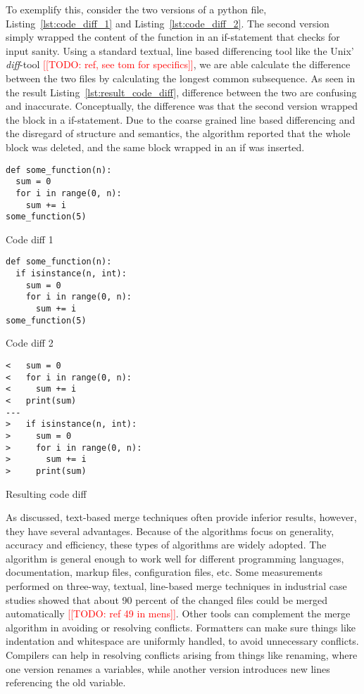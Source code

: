 \documentclass[a4paper,english]{ifimaster}
\newcommand{\todo}[1]{\textcolor{red}{[[TODO: #1]]}\PackageWarning{TODO:}{#1!}}
\begin{document}
To exemplify this, consider the two versions of a python file, Listing~\ref{lst:code_diff_1} and Listing~\ref{lst:code_diff_2}. The second version simply wrapped the content of the function in an if-statement that checks for input sanity. Using a standard textual, line based differencing tool like the Unix' \textit{diff}-tool \todo{ref, see tom for specifics}, we are able calculate the difference between the two files by calculating the longest common subsequence. As seen in the result Listing~\ref{lst:result_code_diff}, difference between the two are confusing and inaccurate. Conceptually, the difference was that the second version wrapped the block in a if-statement. Due to the coarse grained line based differencing and the disregard of structure and semantics, the algorithm reported that the whole block was deleted, and the same block wrapped in an if was inserted.

\begin{listing}
	\begin{verbatim}
def some_function(n):
  sum = 0
  for i in range(0, n):
    sum += i
some_function(5)

  \end{verbatim}
	\caption{Code diff 1}
	\label{lst:code_diff_1}
\end{listing}

\begin{listing}
	\begin{verbatim}
def some_function(n):
  if isinstance(n, int):
    sum = 0
    for i in range(0, n):
      sum += i
some_function(5)
  \end{verbatim}
	\caption{Code diff 2}
	\label{lst:code_diff_2}
\end{listing}

\begin{listing}
	\begin{verbatim}
<   sum = 0
<   for i in range(0, n):
<     sum += i
<   print(sum)
---
>   if isinstance(n, int):
>     sum = 0
>     for i in range(0, n):
>       sum += i
>     print(sum)
  \end{verbatim}
	\caption{Resulting code diff}
	\label{lst:result_code_diff}
\end{listing}

As discussed, text-based merge techniques often provide inferior results, however, they have several advantages. Because of the algorithms focus on generality, accuracy and efficiency, these types of algorithms are widely adopted. The algorithm is general enough to work well for different programming languages, documentation, markup files, configuration files, etc. Some measurements performed on three-way, textual, line-based merge techniques in industrial case studies showed that about 90 percent of the changed files could be merged automatically \todo{ref 49 in mens}. Other tools can complement the merge algorithm in avoiding or resolving conflicts. Formatters can make sure things like indentation and whitespace are uniformly handled, to avoid unnecessary conflicts. Compilers can help in resolving conflicts arising from things like renaming, where one version renames a variables, while another version introduces new lines referencing the old variable.
\end{document}
